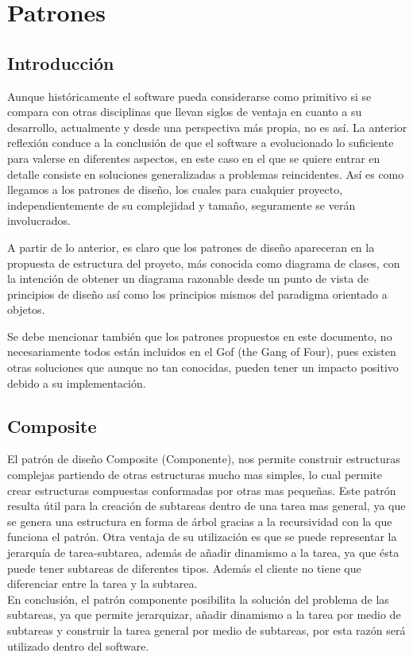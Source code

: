 \chapter{Patrones}
\section{Introducción}
Aunque históricamente el software pueda considerarse como primitivo si se compara con otras disciplinas que llevan siglos de ventaja en cuanto a su desarrollo, actualmente y desde una perspectiva más propia, no es así. La anterior reflexión conduce a la conclusión de que el software a evolucionado lo suficiente para valerse en diferentes aspectos, en este caso en el que se quiere entrar en detalle consiste en soluciones generalizadas a problemas reincidentes. Así es como llegamos a los patrones de diseño, los cuales para cualquier proyecto, independientemente de su complejidad y tamaño, seguramente se verán involucrados.

A partir de lo anterior, es claro que los patrones de diseño apareceran en la propuesta de estructura del proyeto, más conocida como diagrama de clases, con la intención de obtener un diagrama razonable desde un punto de vista de principios de diseño así como los principios mismos del paradigma orientado a objetos. 

Se debe mencionar también que los patrones propuestos en este documento, no necesariamente todos están incluidos en el Gof (the Gang of Four), pues existen otras soluciones que aunque no tan conocidas, pueden tener un impacto positivo debido a su implementación.
\newpage

\section{Composite}
El patrón de diseño Composite (Componente), nos permite construir estructuras complejas partiendo de otras estructuras mucho mas simples, lo cual permite crear estructuras compuestas conformadas por otras mas pequeñas. Este patrón resulta útil para la creación de subtareas dentro de una tarea mas general, ya que se genera una estructura en forma de árbol gracias a la recursividad con la que funciona el patrón. Otra ventaja de su utilización es que se puede representar la jerarquía de tarea-subtarea, además de añadir dinamismo a la tarea, ya que ésta puede tener subtareas de diferentes tipos. Además el cliente no tiene que diferenciar entre la tarea y la subtarea.
\\
En conclusión, el patrón componente posibilita la solución del problema de las subtareas, ya que permite jerarquizar, añadir dinamismo a la tarea por medio de subtareas y construir la tarea general por medio de subtareas, por esta razón será utilizado dentro del software.

